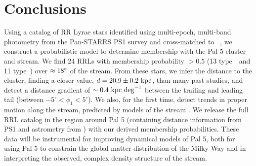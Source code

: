 \documentclass[twocolumn]{aastex63}
\newcommand{\sa}[1]{{\color{teal} SP: #1}}
\begin{document}



\section{Conclusions} \label{sec:conclusions}

Using a catalog of RR Lyrae stars identified using multi-epoch, multi-band photometry from the Pan-STARRS PS1 survey and cross-matched to \Gaia\ , we construct a probabilistic model to determine membership with the Pal 5 cluster and stream.
We find 24 RRLs with membership probability $>0.5$ (13 type~\typeab\ and 11 type~\typec) over $\approx 18\mbox{$^\circ$}$ of the stream.
From these stars, we infer the distance to the cluster, finding a closer value, $d = 20.9 \pm 0.2~\mathrm{kpc}$, than many past studies, and detect a distance gradient of $\sim 0.4~\mathrm{kpc}~{\rm deg}^{-1}$ between the trailing and leading tail (between $-5^\circ < \phi_1 < 5^\circ$).
We also, for the first time, detect trends in proper motion along the stream, predicted by models of the stream \citep[e.g.,][]{Pearson:2017}.
We release the full RRL catalog in the region around Pal 5 (containing distance information from PS1 and astrometry from \Gaia) with our derived membership probabilities.
These data will be instrumental for improving dynamical models of Pal 5, both for using Pal 5 to constrain the global matter distribution of the Milky Way and in interpreting the observed, complex density structure of the stream.
\end{document}
